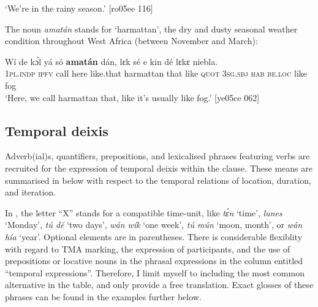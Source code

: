 \glt ‘We’re in the rainy season.’ [ro05ee 116]
\z

The noun \textit{amatán} stands for ‘harmattan’, the dry and dusty seasonal weather condition throughout West Africa (between November and March): 


\ea%
    \label{ex:key:1007}
    \gll Wí    de  kɔ́l  yá    só    \textbf{amatán}    dán,    lɛk  sé 
e    kin  dé    lɛkɛ  niebla.\\
\textsc{1pl.indp}  \textsc{ipfv}  call  here    like.that  harmattan  that    like  \textsc{quot}
\textsc{3sg.sbj}  \textsc{hab}  \textsc{be.loc}  like  fog\\

\glt ‘Here, we call harmattan that, like it’s usually like fog.’ [ye05ce 062]
\z

\subsection{Temporal deixis}\label{sec:8.2.2}

Adverb(ial)s, quantifiers, prepositions, and lexicalised phrases featuring verbs are recruited for the expression of temporal deixis within the clause. These means are summarised in  below with respect to the temporal relations of location, duration, and iteration. 


In , the letter “X” stands for a compatible time-unit, like \textit{tɛ́n} ‘time’, \textit{lunes} ‘Monday’, \textit{tú dé} ‘two days’, \textit{wán wík} ‘one week’, \textit{tú mún} ‘moon, month’, or \textit{wán hía} ‘year’. Optional elements are in parentheses. There is considerable flexiblity with regard to TMA marking, the expression of participants, and the use of prepositions or locative nouns{\fff} in the phrasal expressions in the column entitled “temporal expressions”. Therefore, I limit myself to including the most common alternative in the table, and only provide a free translation. Exact glosses of these phrases can be found in the examples further below.


